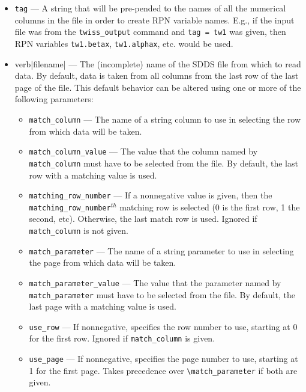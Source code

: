 \documentclass[11pt]{article}
\begin{document}
\begin{itemize}

\item \verb|tag| --- A string that will be pre-pended to the names of all the numerical columns 
 in the file in order to create RPN variable names.  E.g., if the input file was from the
 \verb|twiss_output| command and \verb|tag = tw1| was given, then RPN variables 
 \verb|tw1.betax|, \verb|tw1.alphax|, etc. would be used.

\item verb|filename| --- The (incomplete) name of the SDDS file from which to read data.
    By default, data is taken from all columns from the last row of the last page of the file.
    This default behavior can be altered using one or more of the following parameters:
\begin{itemize}
    
\item \verb|match_column| --- The name of a string column to use in selecting the row from
 which data will be taken.

\item  \verb|match_column_value| --- The value that the column named by \verb|match_column| must
 have to be selected from the file.  By default, the last row with a matching value is used.

\item \verb|matching_row_number| --- If a nonnegative value is given, then the \verb|matching_row_number|$^{th}$
 matching row is selected (0 is the first row, 1 the second, etc).  Otherwise, the last match row is used.  Ignored if \verb|match_column| is not
 given.

\item \verb|match_parameter| --- The name of a string parameter to use in selecting the page
 from which data will be taken.  

\item \verb|match_parameter_value| --- The value that the parameter named by \verb|match_parameter| must
 have to be selected from the file.  By default, the last page with a matching value is used.

\item \verb|use_row| --- If nonnegative, specifies the row number to use, starting at 0 for the first row.
 Ignored if \verb|match_column| is given.

\item \verb|use_page| --- If nonnegative, specifies the page number to use, starting at 1 for the first page.
 Takes precedence over \verb|\match_parameter| if both are given.

\end{itemize}
\end{itemize}
\end{document}
